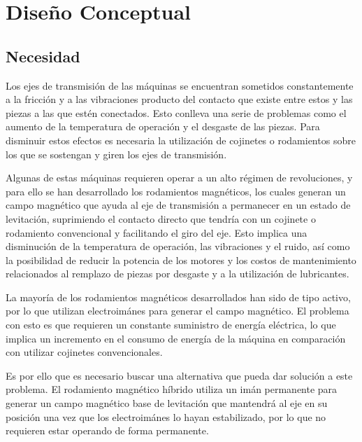%
\chapter{Diseño Conceptual}
\label{sec:system}



\section{Necesidad}
\label{sec:system:sec1}

Los ejes de transmisión de las máquinas se encuentran sometidos constantemente a la fricción y a las vibraciones producto del contacto que existe entre estos y las piezas a las que estén conectados. Esto conlleva una serie de problemas como el aumento de la temperatura de operación y el desgaste de las piezas. Para disminuir estos efectos es necesaria la utilización de cojinetes o rodamientos sobre los que se sostengan y giren los ejes de transmisión.  

Algunas de estas máquinas requieren operar a un alto régimen de revoluciones, y para ello se han desarrollado los rodamientos magnéticos, los cuales generan un campo magnético que ayuda al eje de transmisión a permanecer en un estado de levitación, suprimiendo el contacto directo que tendría con un cojinete o rodamiento convencional y facilitando el giro del eje. Esto implica una disminución de la temperatura de operación, las vibraciones y el ruido, así como la posibilidad de reducir la potencia de los motores y los costos de mantenimiento relacionados al remplazo de piezas por desgaste y a la utilización de lubricantes. 

La mayoría de los rodamientos magnéticos desarrollados han sido de tipo activo, por lo que utilizan electroimánes para generar el campo magnético. El problema con esto es que requieren un constante suministro de energía eléctrica, lo que implica un incremento en el consumo de energía de la máquina en comparación con utilizar cojinetes convencionales. 

Es por ello que es necesario buscar una alternativa que pueda dar solución a este problema. El rodamiento magnético híbrido utiliza un imán permanente para generar un campo magnético base de levitación que mantendrá al eje en su posición una vez que los electroimánes lo hayan estabilizado, por lo que no requieren estar operando de forma permanente. 

